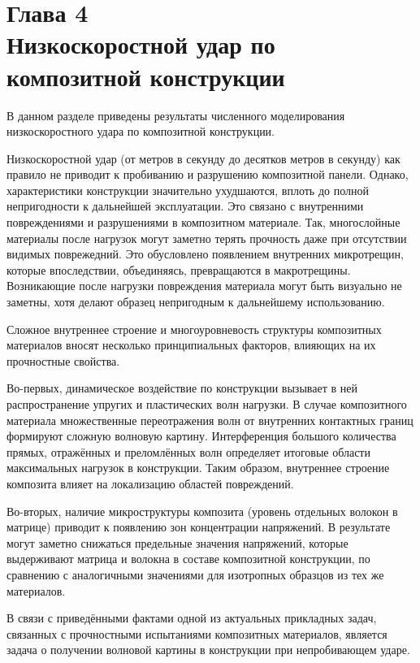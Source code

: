 \clearpage
\newpage


\section*{Глава 4\\Низкоскоростной удар по композитной конструкции}
\setcounter{section}{4}
\setcounter{subsection}{0}
\setcounter{equation}{0}

В данном разделе приведены результаты численного моделирования низкоскоростного
удара по композитной конструкции.

Низкоскоростной удар (от метров в секунду до десятков метров в секунду) 
как правило не приводит к пробиванию и разрушению композитной панели. Однако, 
характеристики конструкции значительно ухудшаются, вплоть до полной непригодности к 
дальнейшей эксплуатации. Это связано с внутренними повреждениями и разрушениями 
в композитном материале. Так, многослойные материалы после нагрузок могут заметно 
терять прочность даже при отсутствии видимых поврежедний.
Это обусловлено появлением внутренних микротрещин, которые впоследствии, объединяясь,
превращаются в макротрещины. Возникающие после нагрузки повреждения
материала могут быть визуально не заметны, хотя делают образец непригодным к
дальнейшему использованию.

Сложное внутреннее строение и многоуровневость структуры композитных материалов вносят несколько 
принципиальных факторов, влияющих на их прочностные свойства.

Во-первых, динамическое воздействие по конструкции вызывает в ней распространение упругих и пластических волн 
нагрузки. В случае композитного материала множественные переотражения волн от внутренних контактных 
границ формируют сложную волновую картину. Интерференция большого количества 
прямых, отражённых и преломлённых волн определяет итоговые области максимальных нагрузок в конструкции. 
Таким образом, внутреннее строение композита влияет на локализацию областей повреждений.

Во-вторых, наличие микроструктуры композита (уровень отдельных волокон в матрице) приводит к появлению зон 
концентрации напряжений. В результате могут заметно снижаться предельные значения напряжений, которые 
выдерживают матрица и волокна в составе композитной конструкции, по сравнению с аналогичными значениями
для изотропных образцов из тех же материалов.

В связи с приведёнными фактами одной из актуальных прикладных задач, связанных с прочностными испытаниями 
композитных материалов, является задача о получении волновой картины в конструкции при
непробивающем ударе. 


